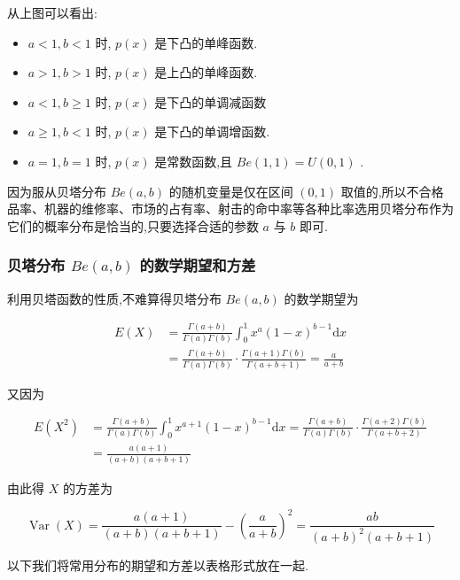 从上图可以看出:
\begin{itemize}
	\item $ a<1,b<1 $ 时, $ p(x) $ 是下凸的单峰函数.
	\item $ a>1,b>1 $ 时, $ p(x) $ 是上凸的单峰函数.
	\item $ a<1,b \geqslant 1 $ 时, $ p(x) $ 是下凸的单调减函数
	\item $ a \geqslant 1, b<1 $ 时, $ p(x) $ 是下凸的单调增函数.
	\item $ a=1,b=1 $ 时, $ p(x) $ 是常数函数,且 $ Be(1,1)=U(0,1) $ .
\end{itemize}

因为服从贝塔分布 $ Be(a,b) $ 的随机变量是仅在区间 $ (0,1) $ 取值的,所以不合格品率、机器的维修率、市场的占有率、射击的命中率等各种比率选用贝塔分布作为它们的概率分布是恰当的,只要选择合适的参数 $ a $ 与 $ b $ 即可.

\subsubsection{贝塔分布 $ Be(a,b) $ 的数学期望和方差}

利用贝塔函数的性质,不难算得贝塔分布 $ Be(a,b) $ 的数学期望为

\[
\begin{aligned} E(X) &=\frac{\Gamma(a+b)}{\Gamma(a) \Gamma(b)} \int_{0}^{1} x^{a}(1-x)^{b-1} \mathrm{d} x \\ &=\frac{\Gamma(a+b)}{\Gamma(a) \Gamma(b)} \cdot \frac{\Gamma(a+1) \Gamma(b)}{\Gamma(a+b+1)}=\frac{a}{a+b} \end{aligned}
\]

又因为

\[
\begin{aligned} E\left(X^{2}\right) &=\frac{\Gamma(a+b)}{\Gamma(a) \Gamma(b)} \int_{0}^{1} x^{a+1}(1-x)^{b-1} \mathrm{d} x=\frac{\Gamma(a+b)}{\Gamma(a) \Gamma(b)} \cdot \frac{\Gamma(a+2) \Gamma(b)}{\Gamma(a+b+2)} \\ &=\frac{a(a+1)}{(a+b)(a+b+1)} \end{aligned}
\]

由此得 $ X $ 的方差为

\[
\operatorname{Var}(X)=\frac{a(a+1)}{(a+b)(a+b+1)}-\left(\frac{a}{a+b}\right)^{2}=\frac{a b}{(a+b)^{2}(a+b+1)}
\]

以下我们将常用分布的期望和方差以表格形式放在一起.

